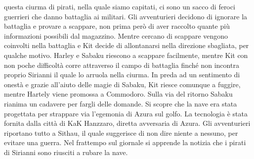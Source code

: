 questa ciurma di pirati, nella quale siamo capitati, ci sono un sacco di
feroci guerrieri che danno battaglia ai militari. Gli avventurieri
decidono di ignorare la battaglia e provare a scappare, non prima però
di aver raccolto quante più informazioni possibili dal magazzino. Mentre
cercano di scappare vengono coinvolti nella battaglia e Kit decide di
allontanarsi nella direzione sbagliata, per qualche motivo. Harley e
Sabaku riescono a scappare facilmente, mentre Kit con non poche
difficoltà corre attraverso il campo di battaglia finché non incontra
proprio Sirianni il quale lo arruola nella ciurma. In preda ad un
sentimento di onestà e grazie all'aiuto delle magie di Sabaku, Kit
riesce comunque a fuggire, mentre Hartely viene promossa a Commodoro.
Sulla via del ritorno Sabaku rianima un cadavere per fargli delle
domande. Si scopre che la nave era stata progettata per strappare via
l'egemonia di Azura sul golfo. La tecnologia è stata fornita dalla città
di KaK Hanzzaro, diretta avversaria di Azura. Gli avventurieri riportano
tutto a Sithau, il quale suggerisce di non dire niente a nessuno, per
evitare una guerra. Nel frattempo sul giornale si apprende la notizia
che i pirati di Sirianni sono riusciti a rubare la nave.
